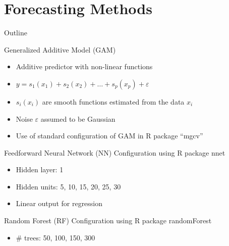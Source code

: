 \documentclass{beamer}
\begin{document}
\section{Forecasting Methods}
\begin{frame}[noframenumbering]{Outline}
\tableofcontents[currentsection]
\end{frame}

\begin{frame}{Generalized Additive Model (GAM)}
\begin{itemize}
\item Additive predictor with non-linear functions
\pause
\item $y=s_1(x_1)+s_2(x_2)+\dots+s_p(x_p)+\varepsilon$
\pause
\item $s_i(x_i)$ are smooth functions estimated from the data $x_i$ %
\pause
\item Noise $\varepsilon$ assumed to be Gaussian
\pause
\item Use of standard configuration of GAM in R package ``mgcv''
\end{itemize}
\end{frame}

\begin{frame}{Feedforward Neural Network (NN)}
Configuration using R package nnet
\pause
\begin{itemize}
\item Hidden layer: 1
\pause
\item Hidden units: 5, 10, 15, 20, 25, 30
\pause
\item Linear output for regression
\pause
\end{itemize}
\begin{figure}
\end{figure}
\end{frame}

\begin{frame}{Random Forest (RF)}
Configuration using R package randomForest
\pause
\begin{itemize}
\item \# trees: 50, 100, 150, 300
\end{itemize}
\bigskip
\begin{figure}
\end{figure}
\end{frame}
\end{document}
